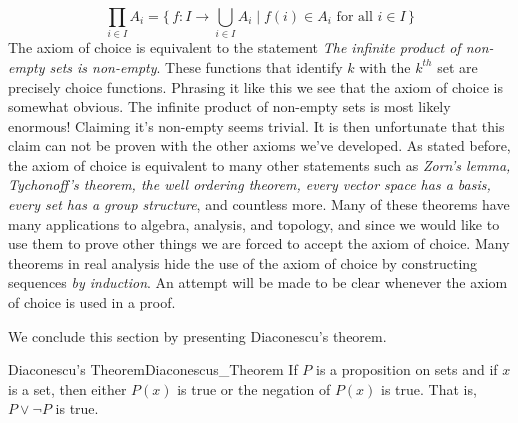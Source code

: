         \begin{equation}
            \prod_{i\in{I}}A_{i}
            =\big\{\,f:I\rightarrow\bigcup_{i\in{I}}A_{i}\;|\;
                f(i)\in{A}_{i}\textrm{ for all }i\in{I}\,\big\}
        \end{equation}
        The axiom of choice is equivalent to the
        statement \textit{The infinite product of non-empty sets is non-empty}.
        These functions that identify $k$ with the $k^{th}$ set are precisely
        choice functions. Phrasing it like this we see that the axiom of choice
        is somewhat obvious. The infinite product of non-empty sets is most
        likely enormous! Claiming it's non-empty seems trivial. It is then
        unfortunate that this claim can not be proven with the other axioms
        we've developed. As stated before, the axiom of choice is equivalent to
        many other statements such as \textit{Zorn's lemma, Tychonoff's theorem,
        the well ordering theorem, every vector space has a basis, every set has
        a group structure}, and countless more. Many of these theorems have many
        applications to algebra, analysis, and topology, and since we would like
        to use them to prove other things we are forced to accept the axiom of
        choice. Many theorems in real analysis hide the use of the axiom of
        choice by constructing sequences \textit{by induction}. An attempt will
        be made to be clear whenever the axiom of choice is used in a proof.
        \par\hfill\par
        We conclude this section by presenting Diaconescu's theorem.
        \begin{ftheorem}{Diaconescu's Theorem}{Diaconescus_Theorem}
            If $P$ is a proposition on sets and if $x$ is a set, then either
            $P(x)$ is true or the negation of $P(x)$ is true. That is,
            $P\lor\neg{P}$ is true.
        \end{ftheorem}
